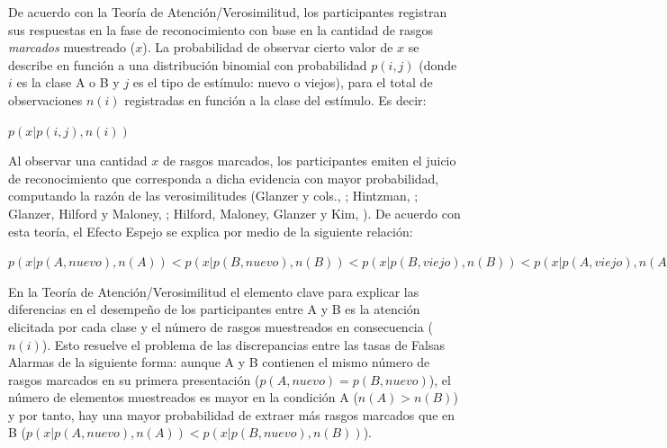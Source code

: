 De acuerdo con la Teoría de Atención/Verosimilitud, los participantes registran sus respuestas en la fase de reconocimiento con base en la cantidad de rasgos \textit{marcados} muestreado ($x$). La probabilidad de observar cierto valor de $x$ se describe en función a una distribución binomial con probabilidad $p(i,j)$ (donde $i$ es la clase A o B y $j$ es el tipo de estímulo: nuevo o viejos), para el total de observaciones $n(i)$ registradas en función a la clase del estímulo. Es decir:\\

\begin{center}
$p(x|p(i,j),n(i))$\\
\end{center}

Al observar una cantidad $x$ de rasgos marcados, los participantes emiten el juicio de reconocimiento que corresponda a dicha evidencia con mayor probabilidad, computando la razón de las verosimilitudes (Glanzer y cols., \citeyear{Glanzer1993}; Hintzman, \citeyear{Hintzman1994}; Glanzer, Hilford y Maloney, \citeyear{Glanzer2009}; Hilford, Maloney, Glanzer y Kim, \citeyear{Hilford2015}). De acuerdo con esta teoría, el Efecto Espejo se explica por medio de la siguiente relación:\\

\begin{center}
$p(x|p(A,nuevo),n(A)) < p(x|p(B,nuevo),n(B)) < p(x|p(B,viejo),n(B)) < p(x|p(A,viejo),n(A))$\\
\end{center}

En la Teoría de Atención/Verosimilitud el elemento clave para explicar las diferencias en el desempeño de los participantes entre A y B es la atención elicitada por cada clase y el número de rasgos muestreados en consecuencia ($n(i)$). Esto resuelve el problema de las discrepancias entre las tasas de Falsas Alarmas de la siguiente forma: aunque A y B contienen el mismo número de rasgos marcados en su primera presentación ($p(A,nuevo) = p(B,nuevo)$), el número de elementos muestreados es mayor en la condición A ($n(A) > n(B)$) y por tanto, hay una mayor probabilidad de extraer más rasgos marcados que en B ($p(x|p(A,nuevo),n(A)) < p(x|p(B,nuevo),n(B))$).\\

